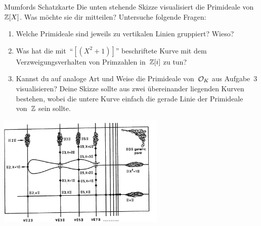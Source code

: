 \documentclass{uebblatt}
\begin{document}
\begin{aufgabe}{Mumfords Schatzkarte}
Die unten stehende Skizze visualisiert die Primideale von~$\mathbb{Z}[X]$.
Was möchte sie dir mitteilen? Untersuche folgende Fragen:
\begin{enumerate}
\item Welche Primideale sind jeweils zu vertikalen Linien gruppiert? Wieso?
\item Was hat die mit~"`$[(X^2+1)]$"' beschriftete Kurve mit dem
Verzweigungsverhalten von Primzahlen in~$\mathbb{Z}[i]$ zu tun?
\item Kannst du auf analoge Art und Weise die Primideale von~$\mathcal{O}_K$ aus
Aufgabe~3 visualisieren? Deine Skizze sollte aus zwei übereinander liegenden
Kurven bestehen, wobei die untere Kurve einfach die gerade Linie der Primideale
von~$\mathbb{Z}$ sein sollte.
\end{enumerate}
\centering\includegraphics[width=0.6\textwidth]{images/mumfords-treasure-map}\par
\end{aufgabe}
\end{document}
